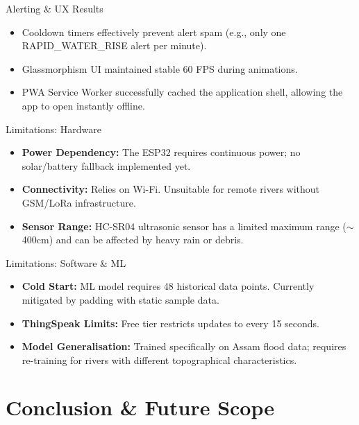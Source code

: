 \documentclass[aspectratio=169]{beamer}
\begin{document}
\begin{frame}{Alerting \& UX Results}
  \begin{itemize}
    \item Cooldown timers effectively prevent alert spam (e.g., only one RAPID\_WATER\_RISE alert per minute).
    \item Glassmorphism UI maintained stable 60 FPS during animations.
    \item PWA Service Worker successfully cached the application shell, allowing the app to open instantly offline.
  \end{itemize}
\end{frame}

\begin{frame}{Limitations: Hardware}
  \begin{itemize}
    \item \textbf{Power Dependency:} The ESP32 requires continuous power; no solar/battery fallback implemented yet.
    \item \textbf{Connectivity:} Relies on Wi-Fi. Unsuitable for remote rivers without GSM/LoRa infrastructure.
    \item \textbf{Sensor Range:} HC-SR04 ultrasonic sensor has a limited maximum range ($\sim$400cm) and can be affected by heavy rain or debris.
  \end{itemize}
\end{frame}

\begin{frame}{Limitations: Software \& ML}
  \begin{itemize}
    \item \textbf{Cold Start:} ML model requires 48 historical data points. Currently mitigated by padding with static sample data.
    \item \textbf{ThingSpeak Limits:} Free tier restricts updates to every 15 seconds.
    \item \textbf{Model Generalisation:} Trained specifically on Assam flood data; requires re-training for rivers with different topographical characteristics.
  \end{itemize}
\end{frame}

\section{Conclusion \& Future Scope}
\end{document}
